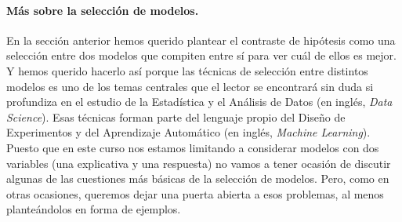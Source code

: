 \paragraph{Más sobre la selección de modelos.}

En la sección anterior hemos querido plantear el contraste de hipótesis como una selección entre dos modelos que compiten entre sí para ver cuál de ellos es mejor. Y hemos querido hacerlo así porque las técnicas de selección entre distintos modelos es uno de los temas centrales que el lector se encontrará sin duda si profundiza en el estudio de la Estadística y el Análisis de Datos (en inglés, {\em Data Science}).  Esas técnicas forman parte del lenguaje propio del Diseño de Experimentos y del Aprendizaje Automático (en inglés, {\em Machine Learning}). Puesto que en este curso nos estamos limitando a considerar modelos con dos variables (una explicativa y una respuesta) no vamos a tener ocasión de discutir algunas de las cuestiones más básicas de la selección de modelos. Pero, como en otras ocasiones, queremos dejar una puerta abierta a esos problemas, al menos planteándolos en forma de ejemplos.


